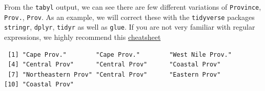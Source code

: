 \documentclass[
  letterpaper,
  DIV=11,
  numbers=noendperiod,
  oneside]{scrreprt}
\newenvironment{Shaded}{\begin{snugshade}}{\end{snugshade}}
\newcommand{\AttributeTok}[1]{\textcolor[rgb]{0.40,0.45,0.13}{#1}}
\newcommand{\CommentTok}[1]{\textcolor[rgb]{0.37,0.37,0.37}{#1}}
\newcommand{\FunctionTok}[1]{\textcolor[rgb]{0.28,0.35,0.67}{#1}}
\newcommand{\NormalTok}[1]{\textcolor[rgb]{0.00,0.23,0.31}{#1}}
\newcommand{\OtherTok}[1]{\textcolor[rgb]{0.00,0.23,0.31}{#1}}
\newcommand{\SpecialCharTok}[1]{\textcolor[rgb]{0.37,0.37,0.37}{#1}}
\newcommand{\StringTok}[1]{\textcolor[rgb]{0.13,0.47,0.30}{#1}}
\begin{document}
From the \texttt{tabyl} output, we can see there are few different
variations of \texttt{Province}, \texttt{Prov.}, \texttt{Prov}. As an
example, we will correct these with the \texttt{tidyverse} packages
\texttt{stringr}, \texttt{dplyr}, \texttt{tidyr} as well as
\texttt{glue}. If you are not very familiar with regular expressions, we
highly recommend this
\href{https://evoldyn.gitlab.io/evomics-2018/ref-sheets/R_strings.pdf}{cheatsheet}

\begin{Shaded}
\end{Shaded}

\begin{verbatim}
 [1] "Cape Prov."        "Cape Prov."        "West Nile Prov."  
 [4] "Central Prov"      "Central Prov"      "Coastal Prov"     
 [7] "Northeastern Prov" "Central Prov"      "Eastern Prov"     
[10] "Coastal Prov"     
\end{verbatim}
\end{document}
